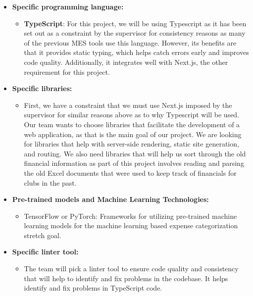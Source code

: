 \documentclass{article}
\begin{document}
\begin{itemize}
  \item \textbf{Specific programming language:}
  \begin{itemize}
      \item \textbf{TypeScript}: For this project, we will be using Typescript as it has been set out as a constraint by the supervisor for consistency reasons as many of the previous MES tools use this language. However, its benefits are that it provides static typing, which helps catch errors early and improves code quality. Additionally, it integrates well with Next.js, the other requirement for this project.
  \end{itemize}
  
  \item \textbf{Specific libraries:}
  
  \begin{itemize}
    \item First, we have a constraint that we must use Next.js imposed by the supervisor for similar reasons above as to why Typescript will be used. Our team wants to choose libraries that facilitate the development of a web application, as that is the main goal of our project. We are looking for libraries that help with server-side rendering, static site generation, and routing. We also need libraries that will help us sort through the old financial information as part of this project involves reading and parsing the old Excel documents that were used to keep track of financials for clubs in the past.
  \end{itemize}
  
  \item \textbf{Pre-trained models and Machine Learning Technologies:}
  \begin{itemize}
      \item TensorFlow or PyTorch: Frameworks for utilizing pre-trained machine learning models for the machine learning based expense categorization stretch goal.
  \end{itemize}
  
  \item \textbf{Specific linter tool:}
  \begin{itemize}
    \item The team will pick a linter tool to ensure code quality and consistency that will help to identify and fix problems in the codebase. It helps identify and fix problems in TypeScript code.
  \end{itemize}
  

\end{itemize}
\end{document}
